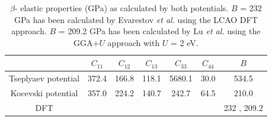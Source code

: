 \documentclass[preprint, 12pt]{elsarticle}
\begin{document}
\begin{table}[h!]
    \centering
    \caption{$\beta$- elastic properties (GPa) as calculated by both potentials. $B$ = 232 GPa has been calculated by Evarestov \textit{et al.} \cite{Evarestov2008} using the LCAO DFT approach. $B$ = 209.2 GPa has been calculated by Lu \textit{et al.} \cite{Lu2011} using the GGA+$U$ approach with $U$ = 2 eV.}
    \footnotesize
    \begin{tabular}{c|ccccc|c}
    \hline
                  & $C_{11}$ & $C_{12}$ & $C_{13}$ & $C_{33}$ & $C_{44}$ & $B$ \\
    \hline
    Tseplyaev potential           & 372.4    & 166.8    & 118.1    & 5680.1   & 30.0     & 534.5 \\

    Kocevski potential & 357.0    & 224.2    & 140.7    & 242.7    & 64.5     & 210.0 \\

    DFT           &          &          &          &          &          & 232 \cite{Evarestov2008}, 209.2 \cite{Lu2011} \\
    \hline
    \end{tabular}
    \label{Tab:ECU2N3}
\end{table}
\end{document}
